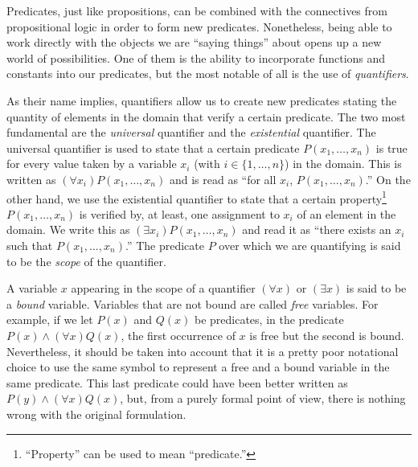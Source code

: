\begin{para}
Predicates, just like propositions, can be combined with the connectives from propositional logic in order to form new predicates.
Nonetheless, being able to work directly with the objects we are ``saying things'' about opens up a new world of possibilities.
One of them is the ability to incorporate functions and constants into our predicates, but the most notable of all is the use of \emph{quantifiers}.

As their name implies, quantifiers allow us to create new predicates stating the quantity of elements in the domain that verify a certain predicate. The two most fundamental are the \emph{universal} quantifier and the \emph{existential} quantifier.
The universal quantifier is used to state that a certain predicate $P(x_1,\ldots,x_n)$ is true for every value taken by a variable $x_i$ (with $i\in\{1,\ldots,n\}$) in the domain. This is written as $(\forall x_i)P(x_1,\ldots,x_n)$ and is read as ``for all $x_i$, $P(x_1,\ldots,x_n)$.''
On the other hand, we use the existential quantifier to state that a certain property\footnote{``Property'' can be used to mean ``predicate.''} $P(x_1,\ldots,x_n)$ is verified by, at least, one assignment to $x_i$ of an element in the domain. We write this as $(\exists x_i)P(x_1,\ldots,x_n)$ and read it as ``there exists an $x_i$ such that $P(x_1,\ldots,x_n)$.''
The predicate $P$ over which we are quantifying is said to be the \emph{scope} of the quantifier.

A variable $x$ appearing in the scope of a quantifier $(\forall x)$ or $(\exists x)$ is said to be a \emph{bound} variable. Variables that are not bound are called \emph{free} variables. For example, if we let $P(x)$ and $Q(x)$ be predicates, in the predicate $P(x) \land (\forall x)Q(x)$, the first occurrence of $x$ is free but the second is bound.
Nevertheless, it should be taken into account that it is a pretty poor notational choice to use the same symbol to represent a free and a bound variable in the same predicate. This last predicate could have been better written as $P(y) \land (\forall x)Q(x)$, but, from a purely formal point of view, there is nothing wrong with the original formulation.
\end{para}


